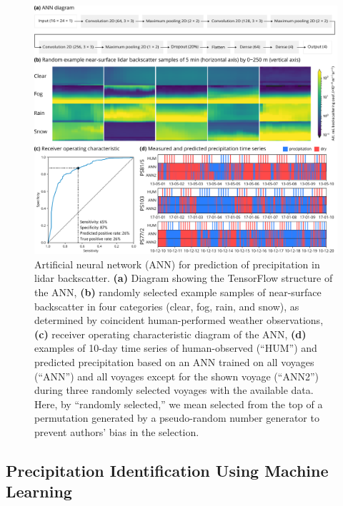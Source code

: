 \documentclass[draft]{agujournal2019}
\begin{document}
\begin{figure}[b!]
\centering
\includegraphics[width=\textwidth]{img/ann.pdf}
\caption{
Artificial neural network (ANN) for prediction of precipitation in lidar backscatter. \textbf{(a)} Diagram showing the TensorFlow structure of the ANN, \textbf{(b)} randomly selected example samples of near-surface backscatter in four categories (clear, fog, rain, and snow), as determined by coincident human-performed weather observations, \textbf{(c)} receiver operating characteristic diagram of the ANN, \textbf{(d)} examples of 10-day time series of human-observed (``HUM'') and predicted precipitation based on an ANN trained on all voyages (``ANN'') and all voyages except for the shown voyage (``ANN2'') during three randomly selected voyages with the available data. Here, by ``randomly selected,'' we mean selected from the top of a permutation generated by a pseudo-random number generator to prevent authors' bias in the selection.
}
\label{fig:ann}
\end{figure}

\subsection{Precipitation Identification Using Machine Learning}
\label{sec:ann}
\end{document}

